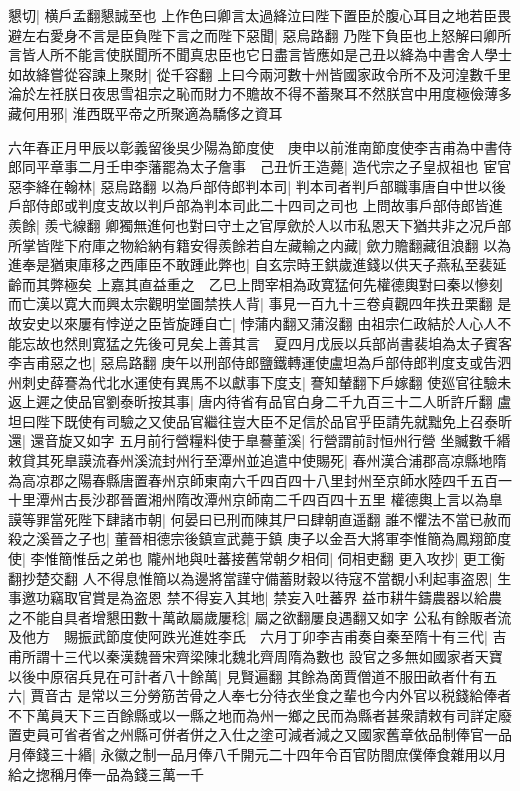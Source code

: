 懇切|{
	横戶孟翻懇誠至也}
上作色曰卿言太過絳泣曰陛下置臣於腹心耳目之地若臣畏避左右愛身不言是臣負陛下言之而陛下惡聞|{
	惡烏路翻}
乃陛下負臣也上怒解曰卿所言皆人所不能言使朕聞所不聞真忠臣也它日盡言皆應如是己丑以絳為中書舍人學士如故絳嘗從容諫上聚財|{
	從千容翻}
上曰今兩河數十州皆國家政令所不及河湟數千里淪於左祍朕日夜思雪祖宗之恥而財力不贍故不得不蓄聚耳不然朕宫中用度極儉薄多藏何用邪|{
	淮西既平帝之所聚適為驕侈之資耳}


六年春正月甲辰以彰義留後吳少陽為節度使　庚申以前淮南節度使李吉甫為中書侍郎同平章事二月壬申李藩罷為太子詹事　己丑忻王造薨|{
	造代宗之子皇叔祖也}
宦官惡李絳在翰林|{
	惡烏路翻}
以為戶部侍郎判本司|{
	判本司者判戶部職事唐自中世以後戶部侍郎或判度支故以判戶部為判本司此二十四司之司也}
上問故事戶部侍郎皆進羨餘|{
	羨弋線翻}
卿獨無進何也對曰守土之官厚歛於人以市私恩天下猶共非之况戶部所掌皆陛下府庫之物給納有籍安得羨餘若自左藏輸之内藏|{
	歛力贍翻藏徂浪翻}
以為進奉是猶東庫移之西庫臣不敢踵此弊也|{
	自玄宗時王鉷歲進錢以供天子燕私至裴延齡而其弊極矣}
上嘉其直益重之　乙巳上問宰相為政寛猛何先權德輿對曰秦以慘刻而亡漢以寛大而興太宗觀明堂圖禁抶人背|{
	事見一百九十三卷貞觀四年抶丑栗翻}
是故安史以來屢有悖逆之臣皆旋踵自亡|{
	悖蒲内翻又蒲沒翻}
由祖宗仁政結於人心人不能忘故也然則寛猛之先後可見矣上善其言　夏四月戊辰以兵部尚書裴垍為太子賓客李吉甫惡之也|{
	惡烏路翻}
庚午以刑部侍郎鹽鐵轉運使盧坦為戶部侍郎判度支或告泗州刺史薛謇為代北水運使有異馬不以獻事下度支|{
	謇知輦翻下戶嫁翻}
使廵官往驗未返上遲之使品官劉泰昕按其事|{
	唐内待省有品官白身二千九百三十二人昕許斤翻}
盧坦曰陛下既使有司驗之又使品官繼往豈大臣不足信於品官乎臣請先就黜免上召泰昕還|{
	還音旋又如字}
五月前行營糧料使于臯謩董溪|{
	行營謂前討恒州行營}
坐贓數千緡敕貸其死臯謨流春州溪流封州行至潭州並追遣中使賜死|{
	春州漢合浦郡高凉縣地隋為高凉郡之陽春縣唐置春州京師東南六千四百四十八里封州至京師水陸四千五百一十里潭州古長沙郡晉置湘州隋改潭州京師南二千四百四十五里}
權德輿上言以為臯謨等罪當死陛下肆諸市朝|{
	何晏曰已刑而陳其尸曰肆朝直遥翻}
誰不懼法不當已赦而殺之溪晉之子也|{
	董晉相德宗後鎮宣武薨于鎮}
庚子以金吾大將軍李惟簡為鳳翔節度使|{
	李惟簡惟岳之弟也}
隴州地與吐蕃接舊常朝夕相伺|{
	伺相吏翻}
更入攻抄|{
	更工衡翻抄楚交翻}
人不得息惟簡以為邊將當謹守備蓄財穀以待寇不當覩小利起事盗恩|{
	生事邀功竊取官賞是為盗恩}
禁不得妄入其地|{
	禁妄入吐蕃界}
益市耕牛鑄農器以給農之不能自具者增懇田數十萬畝屬歲屢稔|{
	屬之欲翻屢良遇翻又如字}
公私有餘販者流及他方　賜振武節度使阿跌光進姓李氏　六月丁卯李吉甫奏自秦至隋十有三代|{
	吉甫所謂十三代以秦漢魏晉宋齊梁陳北魏北齊周隋為數也}
設官之多無如國家者天寶以後中原宿兵見在可計者八十餘萬|{
	見賢遍翻}
其餘為啇賈僧道不服田畝者什有五六|{
	賈音古}
是常以三分勞筋苦骨之人奉七分待衣坐食之輩也今内外官以税錢給俸者不下萬員天下三百餘縣或以一縣之地而為州一鄉之民而為縣者甚衆請敕有司詳定廢置吏員可省者省之州縣可併者併之入仕之塗可減者減之又國家舊章依品制俸官一品月俸錢三十緡|{
	永徽之制一品月俸八千開元二十四年令百官防閤庶僕俸食雜用以月給之揔稱月俸一品為錢三萬一千}
